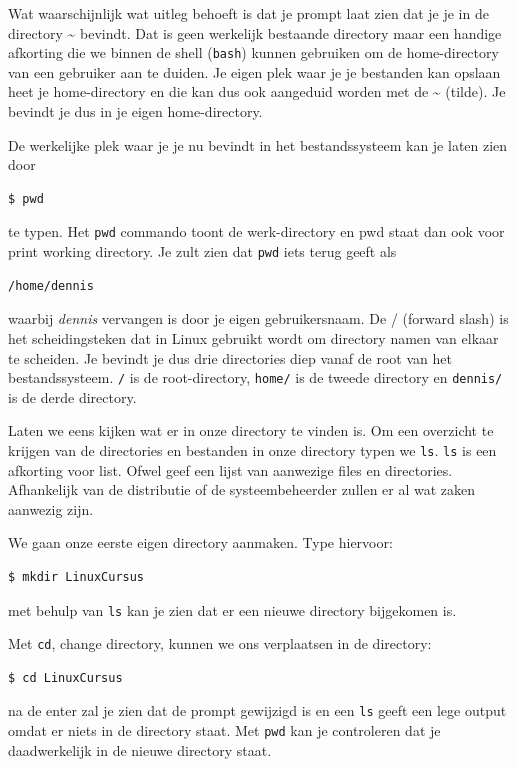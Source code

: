 Wat waarschijnlijk wat uitleg behoeft is dat je prompt laat zien dat je je in de directory \~{} bevindt. Dat is geen werkelijk bestaande directory maar een handige afkorting die we binnen de shell (\texttt{bash}) kunnen gebruiken om de home-directory van een gebruiker aan te duiden. Je eigen plek waar je je bestanden kan opslaan heet je home-directory en die kan dus ook aangeduid worden met de \~{} (tilde). Je bevindt je dus in je eigen home-directory.

De werkelijke plek waar je je nu bevindt in het bestandssysteem kan je laten zien door
\begin{lstlisting}[language=bash]
$ pwd
\end{lstlisting}
te typen. Het \texttt{pwd} commando toont de werk-directory en pwd staat dan ook voor print working directory. Je zult zien dat
\texttt{pwd} iets terug geeft als
\begin{lstlisting}[language=bash]
/home/dennis
\end{lstlisting}
waarbij \textit{dennis} vervangen is door je eigen gebruikersnaam. De / (forward slash) is het scheidingsteken dat in Linux gebruikt wordt om directory namen van elkaar te scheiden. Je bevindt je dus drie directories diep vanaf de root van het bestandssysteem. \texttt{/} is de root-directory, \texttt{home/} is de tweede directory en \texttt{dennis/} is de derde directory.

Laten we eens kijken wat er in onze directory te vinden is. Om een overzicht te krijgen van de directories en bestanden in onze directory typen we \texttt{ls}. \texttt{ls} is een afkorting voor list. Ofwel geef een lijst van aanwezige files en directories. Afhankelijk van de distributie of de systeembeheerder zullen er al wat zaken aanwezig zijn.

We gaan onze eerste eigen directory aanmaken. Type hiervoor:
\begin{lstlisting}[language=bash]
$ mkdir LinuxCursus
\end{lstlisting}
met behulp van \texttt{ls} kan je zien dat er een nieuwe directory bijgekomen is.

Met \texttt{cd}, change directory, kunnen we ons verplaatsen in de directory:
\begin{lstlisting}[language=bash]
$ cd LinuxCursus
\end{lstlisting}
na de enter zal je zien dat de prompt gewijzigd is en een \texttt{ls} geeft een lege output omdat er niets in de directory staat. Met \texttt{pwd} kan je controleren dat je daadwerkelijk in de nieuwe directory staat.

